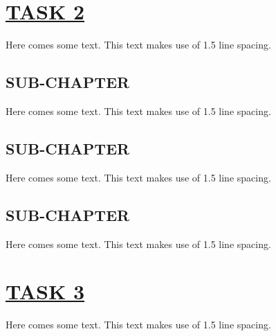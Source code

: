 \documentclass[fontsize=11pt]{scrartcl}
\begin{document}
\pagebreak
\section{\uline{TASK 2}}
Here comes some text. This text makes use of 1.5 line spacing. 
\subsection{SUB-CHAPTER}
Here comes some text. This text makes use of 1.5 line spacing. 
\subsection{SUB-CHAPTER}
Here comes some text. This text makes use of 1.5 line spacing. 
\subsection{SUB-CHAPTER}
Here comes some text. This text makes use of 1.5 line spacing. 
\pagebreak
\section{\uline{TASK 3}}
Here comes some text. This text makes use of 1.5 line spacing. 
\end{document}
